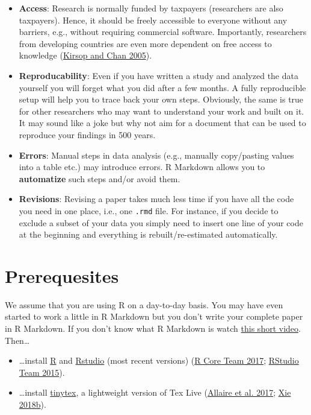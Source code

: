 \documentclass[
  12pt,
]{article}
\providecommand{\tightlist}{%
  \setlength{\itemsep}{0pt}\setlength{\parskip}{0pt}}
\begin{document}
\begin{itemize}
\tightlist
\item
  \textbf{Access}: Research is normally funded by taxpayers (researchers are also taxpayers). Hence, it should be freely accessible to everyone without any barriers, e.g., without requiring commercial software. Importantly, researchers from developing countries are even more dependent on free access to knowledge (\protect\hyperlink{ref-Kirsop2005-ro}{Kirsop and Chan 2005}).
\item
  \textbf{Reproducability}: Even if you have written a study and analyzed the data yourself you will forget what you did after a few months. A fully reproducible setup will help you to trace back your own steps. Obviously, the same is true for other researchers who may want to understand your work and built on it. It may sound like a joke but why not aim for a document that can be used to reproduce your findings in 500 years.
\item
  \textbf{Errors}: Manual steps in data analysis (e.g., manually copy/pasting values into a table etc.) may introduce errors. R Markdown allows you to \textbf{automatize} such steps and/or avoid them.
\item
  \textbf{Revisions}: Revising a paper takes much less time if you have all the code you need in one place, i.e., one \texttt{.rmd} file. For instance, if you decide to exclude a subset of your data you simply need to insert one line of your code at the beginning and everything is rebuilt/re-estimated automatically.
\end{itemize}

\hypertarget{prerequesites}{%
\section{Prerequesites}\label{prerequesites}}

We assume that you are using R on a day-to-day basis. You may have even started to work a little in R Markdown but you don't write your complete paper in R Markdown. If you don't know what R Markdown is watch \href{https://vimeo.com/178485416}{this short video}. Then\ldots{}

\begin{itemize}
\tightlist
\item
  \ldots install \href{https://www.r-project.org/}{R} and \href{https://www.rstudio.com/}{Rstudio} (most recent versions) (\protect\hyperlink{ref-R2017}{R Core Team 2017}; \protect\hyperlink{ref-Rstudio2015}{RStudio Team 2015}).
\item
  \ldots install \href{https://yihui.name/tinytex/}{tinytex}, a lightweight version of Tex Live (\protect\hyperlink{ref-markdown2017}{Allaire et al. 2017}; \protect\hyperlink{ref-tinytex}{Xie 2018b}).
\end{itemize}
\end{document}
